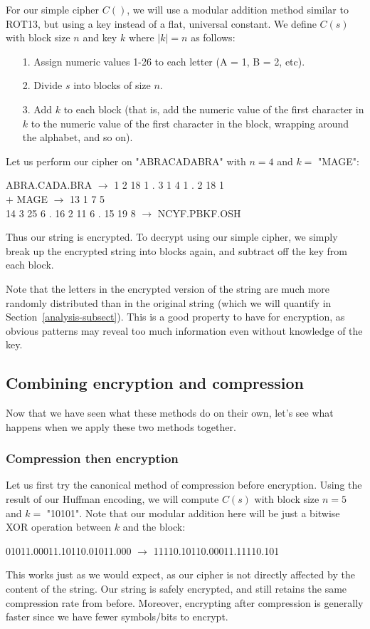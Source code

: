 \documentclass[11pt]{article}
\newcommand\genref{}
\newcommand\sectref{}
\def\genref#1#2{#1~\ref{#2}}
\def\sectref#1{\genref{Section}{#1}}
\begin{document}
For our simple cipher $C()$, we will use a modular addition method similar to ROT13, but using a key instead 
of a flat, universal constant. We define $C(s)$ with block size $n$ and key $k$ where $|k|=n$ as follows: 
\begin{itemize}
	\item[1.] Assign numeric values 1-26 to each letter (A = 1, B = 2, etc).
	\item[2.] Divide $s$ into blocks of size $n$.
	\item[3.] Add $k$ to each block (that is, add the numeric value of the first character in $k$ to the 
numeric value of the first character in the block, wrapping around the alphabet, and so on). 
\end{itemize}
Let us perform our cipher on "ABRACADABRA" with $n=4$ and $k=$ "MAGE":
\begin{center}
	ABRA.CADA.BRA $\rightarrow$ 1 2 18 1 . 3 1 4 1 . 2 18 1\\
	$+$ MAGE $\rightarrow$ 13 1 7 5\\
	14 3 25 6 . 16 2 11 6 . 15 19 8 $\rightarrow$ NCYF.PBKF.OSH\\
\end{center}
Thus our string is encrypted. To decrypt using our simple cipher, we simply break up the encrypted string into 
blocks again, and subtract off the key from each block.

Note that the letters in the encrypted version of the string are much more randomly distributed than in the 
original string (which we will quantify in \sectref{analysis-subsect}). This is a good property to have for encryption, 
as obvious patterns may reveal too much information even without knowledge of the key.

\subsection{Combining encryption and compression}\label{encrypt-plus-compress-subsect}
Now that we have seen what these methods do on their own, let's see what happens when we apply these two methods together. 

\subsubsection{Compression then encryption}\label{e-then-c-subsubsect}
Let us first try the canonical method of compression before encryption. Using the result of our Huffman encoding, we will compute 
$C(s)$ with block size $n=5$ and $k=$ "10101". Note that our modular addition here will be just a bitwise XOR operation between 
$k$ and the block:
\begin{center}
	01011.00011.10110.01011.000 $\rightarrow$ 11110.10110.00011.11110.101\\
\end{center}
This works just as we would expect, as our cipher is not directly affected by the content of the string. Our string is 
safely encrypted, and still retains the same compression rate from before. Moreover, encrypting after compression 
is generally faster since we have fewer symbols/bits to encrypt. 
\end{document}
